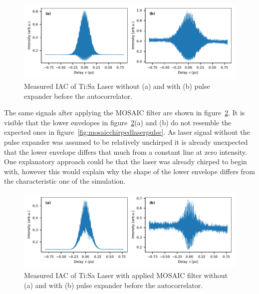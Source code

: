 \begin{figure}[H]
	\centering
	\includegraphics[width=\linewidth]{figures/chirp/plots/measured_chirped_laser_pulse_before_MOSAIC}
	\caption{Measured IAC of Ti:Sa Laser without (a) and with (b) pulse expander before the autocorrelator.}
	\label{fig:measuredchirpedlaserpulsebeforemosaic}
\end{figure}

The same signals after applying the \ac{MOSAIC} filter are shown in figure~\ref{fig:measuredchirpedlaserpulseaftermosaic}.
It is visible that the lower envelopes in figure~\ref{fig:measuredchirpedlaserpulseaftermosaic}(a) and (b) do not resemble the expected ones in figure~\ref{fig:mosaicchirpedlaserpulse}.
As laser signal without the pulse expander was assumed to be relatively unchirped it is already unexpected that the lower envelope differs that much from a constant line at zero intensity.
One explanatory approach could be that the laser was already chirped to begin with, however this would explain why the shape of the lower envelope differs from the characteristic one of the simulation.

\begin{figure}[H]
	\centering
	\includegraphics[width=\linewidth]{figures/chirp/plots/measured_chirped_laser_pulse_after_MOSAIC}
	\caption{Measured IAC of Ti:Sa Laser with applied MOSAIC filter without (a) and with (b) pulse expander before the autocorrelator.}
	\label{fig:measuredchirpedlaserpulseaftermosaic}
\end{figure}


